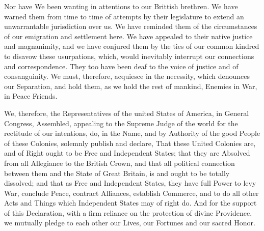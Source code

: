 Nor have We been wanting in attentions to our Brittish brethren. We
have warned them from time to time of attempts by their legislature to
extend an unwarrantable jurisdiction over us. We have reminded them of
the circumstances of our emigration and settlement here. We have
appealed to their native justice and magnanimity, and we have conjured
them by the ties of our common kindred to disavow these usurpations,
which, would inevitably interrupt our connections and
correspondence. They too have been deaf to the voice of justice and of
consanguinity. We must, therefore, acquiesce in the necessity, which
denounces our Separation, and hold them, as we hold the rest of
mankind, Enemies in War, in Peace Friends.

We, therefore, the Representatives of the united States of America, in
General Congress, Assembled, appealing to the Supreme Judge of the
world for the rectitude of our intentions, do, in the Name, and by
Authority of the good People of these Colonies, solemnly publish and
declare, That these United Colonies are, and of Right ought to be Free
and Independent States; that they are Absolved from all Allegiance to
the British Crown, and that all political connection between them and
the State of Great Britain, is and ought to be totally dissolved; and
that as Free and Independent States, they have full Power to levy War,
conclude Peace, contract Alliances, establish Commerce, and to do all
other Acts and Things which Independent States may of right do. And
for the support of this Declaration, with a firm reliance on the
protection of divine Providence, we mutually pledge to each other our
Lives, our Fortunes and our sacred Honor.

